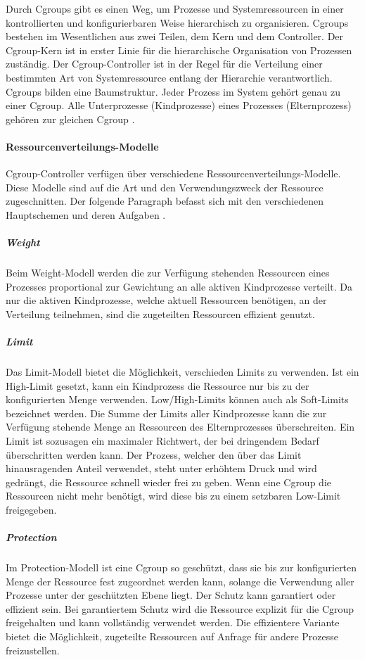 Durch Cgroups gibt es einen Weg, um Prozesse und Systemressourcen in einer kontrollierten und konfigurierbaren Weise hierarchisch zu organisieren. Cgroups bestehen im Wesentlichen aus zwei Teilen, dem Kern und dem Controller. Der Cgroup-Kern ist in erster Linie für die hierarchische Organisation von Prozessen zuständig. Der Cgroup-Controller ist in der Regel für die Verteilung einer bestimmten Art von Systemressource entlang der Hierarchie verantwortlich. Cgroups bilden eine Baumstruktur. Jeder Prozess im System gehört genau zu einer Cgroup. Alle Unterprozesse (Kindprozesse) eines Prozesses (Elternprozess) gehören zur gleichen Cgroup \cite{Heo2015ControlV2}. 


\paragraph{Ressourcenverteilungs-Modelle}
Cgroup-Controller verfügen über verschiedene Ressourcenverteilungs-Modelle. Diese Modelle sind auf die Art und den Verwendungszweck der Ressource zugeschnitten. Der folgende Paragraph befasst sich mit den verschiedenen Hauptschemen und deren Aufgaben \cite{Heo2015ControlV2}.

\subparagraph{Weight}
Beim Weight-Modell werden die zur Verfügung stehenden Ressourcen eines Prozesses proportional zur Gewichtung an alle aktiven Kindprozesse verteilt. Da nur die aktiven Kindprozesse, welche aktuell Ressourcen benötigen, an der Verteilung teilnehmen, sind die zugeteilten Ressourcen effizient genutzt. 

\subparagraph{Limit}
Das Limit-Modell bietet die Möglichkeit, verschieden Limits zu verwenden. Ist ein High-Limit gesetzt, kann ein Kindprozess die Ressource nur bis zu der konfigurierten Menge verwenden. Low/High-Limits können auch als Soft-Limits bezeichnet werden. Die Summe der Limits aller Kindprozesse kann die zur Verfügung stehende Menge an Ressourcen des Elternprozesses überschreiten. Ein Limit ist sozusagen ein maximaler Richtwert, der bei dringendem Bedarf überschritten werden kann. Der Prozess, welcher den über das Limit hinausragenden Anteil verwendet, steht unter erhöhtem Druck und wird gedrängt, die Ressource schnell wieder frei zu geben. Wenn eine Cgroup die Ressourcen nicht mehr benötigt, wird diese bis zu einem setzbaren Low-Limit freigegeben.


\subparagraph{Protection}
Im Protection-Modell ist eine Cgroup so geschützt, dass sie bis zur konfigurierten Menge der Ressource fest zugeordnet werden kann, solange die Verwendung aller Prozesse unter der geschützten Ebene liegt. Der Schutz kann garantiert oder effizient sein. Bei garantiertem Schutz wird die Ressource explizit für die Cgroup freigehalten und kann vollständig verwendet werden. Die effizientere Variante bietet die Möglichkeit, zugeteilte Ressourcen auf Anfrage für andere Prozesse freizustellen.


